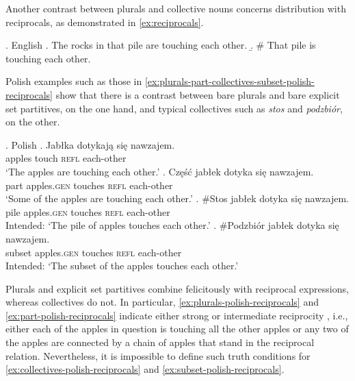 Another contrast between plurals and collective nouns concerns distribution with reciprocals, as demonstrated in \ref{ex:reciprocals}. 

\ex.\label{ex:reciprocals} English \citep[p. 168]{schwarzschild1996pluralities}
\a. The rocks in that pile are touching each other.\label{ex:reciprocals-plural}
\b. \# That pile is touching each other.\label{ex:reciprocals-group}

Polish examples such as those in \ref{ex:plurals-part-collectives-subset-polish-reciprocals} show that there is a contrast between bare plurals and bare explicit set partitives, on the one hand, and typical collectives such as \textit{stos} and \textit{podzbiór}, on the other. 

\ex.\label{ex:plurals-part-collectives-subset-polish-reciprocals} Polish
\ag. Jabłka dotykają się nawzajem.\label{ex:plurals-polish-reciprocals}\\
apples touch \textsc{refl} each-other\\
`The apples are touching each other.'
\bg. Część jabłek dotyka się nawzajem.\label{ex:part-polish-reciprocals}\\
part apples\textsc{.gen} touches \textsc{refl} each-other\\
`Some of the apples are touching each other.'
\bg. \#Stos jabłek dotyka się nawzajem.\label{ex:collectives-polish-reciprocals}\\
pile apples\textsc{.gen} touches \textsc{refl} each-other\\
Intended: `The pile of apples touches each other.'
\bg. \#Podzbiór jabłek dotyka się nawzajem.\label{ex:subset-polish-reciprocals}\\
subset apples\textsc{.gen} touches \textsc{refl} each-other\\
Intended: `The subset of the apples touches each other.'

Plurals and explicit set partitives combine felicitously with reciprocal expressions, whereas collectives do not. In particular, \ref{ex:plurals-polish-reciprocals} and \ref{ex:part-polish-reciprocals} indicate either strong or intermediate reciprocity \citep{fiengo_lasnik1973logical,dalrymple1998reciprocal,beck2001reciprocals}, i.e., either each of the apples in question is touching all the other apples or any  two of the apples are connected by a chain of apples that  stand in the reciprocal relation. Nevertheless, it is impossible to define such truth conditions for \ref{ex:collectives-polish-reciprocals} and \ref{ex:subset-polish-reciprocals}.

